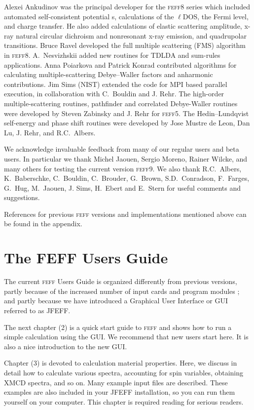 \documentclass[11pt,oneside]{report} %
\renewcommand{\htmlref}[2]{\hyperlink{#2}{#1}}
\newcommand{\program}[1]{\textsc{#1}}
\newcommand{\feff}{\program{feff}}
\newcommand{\vnum}{9}
\newcommand{\feffcur}{\feff\vnum}
\renewcommand{\htmlref}[2]{{#1}} %
\begin{document}
\begin{latexonly}
Alexei Ankudinov was the principal developer for
the {\feff}8 series which included automated self-consistent potential
s, calculations of the $\ell$DOS, the Fermi level, and charge transfer.
He also added calculations of elastic scattering
amplitude, x-ray natural circular dichroism and nonresonant x-ray
emission, and quadrupolar transitions.  Bruce Ravel developed the full
multiple scattering (FMS) algorithm in {\feff}8. 
A.\ Nesvizhskii added new routines for TDLDA and sum-rules
applications. Anna Poiarkova and Patrick Konrad
contributed algorithms for calculating multiple-scattering Debye--Waller
factors and anharmonic contributions. Jim Sims (NIST) extended the code for
MPI based parallel execution, in collaboration with C.\ Bouldin and
J. Rehr.  The high-order multiple-scattering routines, pathfinder and
correlated Debye-Waller routines were developed by Steven Zabinsky and
J. Rehr for {\feff}5.
The Hedin--Lundqvist self-energy and phase shift routines were developed
by Jose Mustre de Leon, Dan Lu, J. Rehr, and R.C.~Albers.

We acknowledge invaluable feedback from many of our regular users and beta users.  In particular we thank Michel Jaouen, Sergio Moreno, Rainer Wilcke, and many others for testing the current version {\feffcur}.  We also thank R.C.\
Albers, K.\ Baberschke, C.\ Bouldin, C.\ Brouder, G.\ Brown,
S.D.\ Conradson, F.\ Farges, G.\ Hug, M.\ Jaouen, J. Sims, H.\ Ebert and
E.\ Stern for useful comments and suggestions.

References for previous {\feff} versions and implementations mentioned above can be found in the appendix.



\newpage
\section{The FEFF Users Guide}
\label{sec:UG}

The current {\feff} Users Guide is organized differently from previous versions, partly because of
the increased number of input cards and program modules ; and partly because
we have introduced a Graphical User Interface or GUI referred to as JFEFF.

The next chapter (2) is a \htmlref{quick start guide}{sec:tutorial} to {\feff} and shows how to run a simple calculation
using the GUI.  We recommend that new users start here.  It is also a nice introduction to the new GUI.

Chapter (3) is devoted to \htmlref{calculation material properties}{sec:Calc-Strat-Exampl}.  Here, we discuss in detail how to calculate various spectra, accounting for spin variables, obtaining XMCD spectra, and so on.  Many example input files are described.  These examples are also included in your JFEFF installation, so you can run them yourself on your computer.  This chapter is required reading for serious readers.


\end{latexonly}
\end{document}
